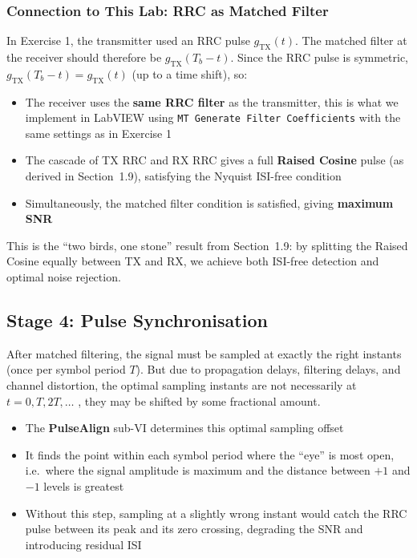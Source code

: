 \subsubsection{Connection to This Lab: RRC as Matched Filter}

In Exercise 1, the transmitter used an RRC pulse $g_{\text{TX}}(t)$. The matched filter at the receiver should therefore be $g_{\text{TX}}(T_b - t)$. Since the RRC pulse is symmetric, $g_{\text{TX}}(T_b - t) = g_{\text{TX}}(t)$ (up to a time shift), so:

\begin{itemize}
\item The receiver uses the \textbf{same RRC filter} as the transmitter,  this is what we implement in LabVIEW using \texttt{MT Generate Filter Coefficients} with the same settings as in Exercise 1
\item The cascade of TX RRC and RX RRC gives a full \textbf{Raised Cosine} pulse (as derived in Section~1.9), satisfying the Nyquist ISI-free condition
\item Simultaneously, the matched filter condition is satisfied, giving \textbf{maximum SNR}
\end{itemize}

This is the ``two birds, one stone'' result from Section~1.9: by splitting the Raised Cosine equally between TX and RX, we achieve both ISI-free detection and optimal noise rejection.

\subsection{Stage 4: Pulse Synchronisation}

After matched filtering, the signal must be sampled at exactly the right instants (once per symbol period $T$). But due to propagation delays, filtering delays, and channel distortion, the optimal sampling instants are not necessarily at $t = 0, T, 2T, \ldots$ , they may be shifted by some fractional amount.

\begin{itemize}
\item The \textbf{PulseAlign} sub-VI determines this optimal sampling offset
\item It finds the point within each symbol period where the ``eye'' is most open, i.e.\ where the signal amplitude is maximum and the distance between $+1$ and $-1$ levels is greatest
\item Without this step, sampling at a slightly wrong instant would catch the RRC pulse between its peak and its zero crossing, degrading the SNR and introducing residual ISI
\end{itemize}

